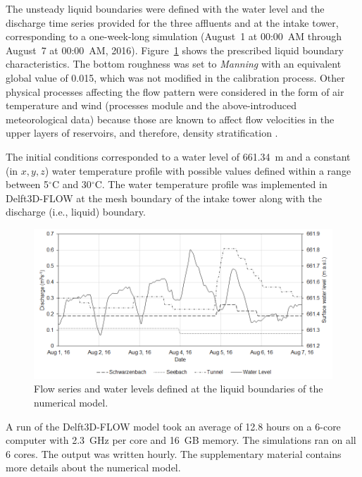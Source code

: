 \documentclass[draft,linenumbers,onecolumn]{agujournal2019} %
\begin{document}
The unsteady liquid boundaries were defined with the water level and the discharge time series provided for the three affluents and at the intake tower, corresponding to a one-week-long simulation (August~1 at 00:00~AM through August~7 at 00:00~AM, 2016). Figure~\ref{fig:liquid-bound-fluxes} shows the prescribed liquid boundary characteristics. The bottom roughness was set to \textit{Manning} with an equivalent global value of 0.015, which was not modified in the calibration process. Other physical processes affecting the flow pattern were considered in the form of air temperature and wind (processes module and the above-introduced meteorological data) because those are known to affect flow velocities in the upper layers of reservoirs, and therefore, density stratification \cite{zhen-gang_hydrodynamics_2008, dissanayake_delft3d_2019}.

The initial conditions corresponded to a water level of 661.34~m and a constant (in $x, y, z$) water temperature profile with possible values defined within a range between 5$^{\circ}$C and 30$^{\circ}$C. The water temperature profile was implemented in Delft3D-FLOW at the mesh boundary of the intake tower along with the discharge (i.e., liquid) boundary.

\begin{figure}
	\centering
	\includegraphics[width=14.5cm]{inflow-series.png}
	\caption{Flow series and water levels defined at the liquid boundaries of the numerical model.}
	\label{fig:liquid-bound-fluxes}
\end{figure}

A run of the Delft3D-FLOW model took an average of 12.8 hours on a 6-core computer with 2.3~GHz per core and 16~GB memory. The simulations ran on all 6 cores. The output was written hourly. The supplementary material contains more details about the numerical model.
\end{document}
